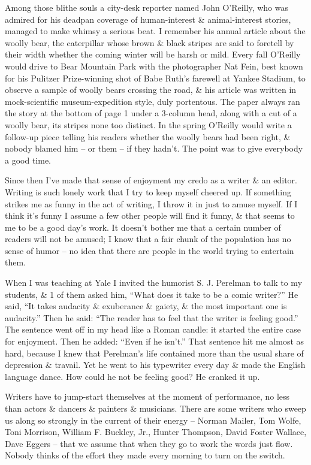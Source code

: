 \documentclass{article}
\numberwithin{equation}{section}
\begin{document}
Among those blithe souls a city-desk reporter named John O'Reilly, who was admired for his deadpan coverage of human-interest \& animal-interest stories, managed to make whimsy a serious beat. I remember his annual article about the woolly bear, the caterpillar whose brown \& black stripes are said to foretell by their width whether the coming winter will be harsh or mild. Every fall O'Reilly would drive to Bear Mountain Park with the photographer Nat Fein, best known for his Pulitzer Prize-winning shot of Babe Ruth's farewell at Yankee Stadium, to observe a sample of woolly bears crossing the road, \& his article was written in mock-scientific museum-expedition style, duly portentous. The paper always ran the story at the bottom of page 1 under a 3-column head, along with a cut of a woolly bear, its stripes none too distinct. In the spring O'Reilly would write a follow-up piece telling his readers whether the woolly bears had been right, \& nobody blamed him -- or them -- if they hadn't. The point was to give everybody a good time.

Since then I've made that sense of enjoyment my credo as a writer \& an editor. Writing is such lonely work that I try to keep myself cheered up. If something strikes me as funny in the act of writing, I throw it in just to amuse myself. If I think it's funny I assume a few other people will find it funny, \& that seems to me to be a good day's work. It doesn't bother me that a certain number of readers will not be amused; I know that a fair chunk of the population has no sense of humor -- no idea that there are people in the world trying to entertain them.

When I was teaching at Yale I invited the humorist S. J. Perelman to talk to my students, \& 1 of them asked him, ``What does it take to be a comic writer?'' He said, ``It takes audacity \& exuberance \& gaiety, \& the most important one is audacity.'' Then he said: ``The reader has to feel that the writer is feeling good.'' The sentence went off in my head like a Roman candle: it started the entire case for enjoyment. Then he added: ``Even if he isn't.'' That sentence hit me almost as hard, because I knew that Perelman's life contained more than the usual share of depression \& travail. Yet he went to his typewriter every day \& made the English language dance. How could he not be feeling good? He cranked it up.

Writers have to jump-start themselves at the moment of performance, no less than actors \& dancers \& painters \& musicians. There are some writers who sweep us along so strongly in the current of their energy -- Norman Mailer, Tom Wolfe, Toni Morrison, William F. Buckley, Jr., Hunter Thompson, David Foster Wallace, Dave Eggers -- that we assume that when they go to work the words just flow. Nobody thinks of the effort they made every morning to turn on the switch.
\end{document}
